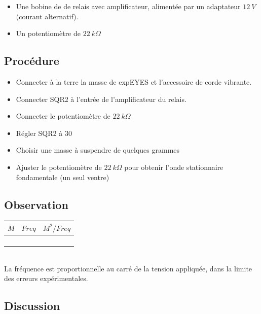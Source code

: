 \documentclass{book}
\begin{document}
\begin{itemize}
  \item Une bobine de de relais avec amplificateur, alimentée par un adaptateur $12\ V$ (courant alternatif).
  \item Un potentiomètre de $22\ k\Omega$
\end{itemize}

\subsection{Procédure}


\begin{itemize}
  \item Connecter à la terre la masse de expEYES et l'accessoire de corde vibrante.
  \item Connecter SQR2 à l'entrée de l'amplificateur du relais.
  \item Connecter le potentiomètre de $22\ k\Omega$
  \item Régler SQR2 à 30
  \item Choisir une masse à suspendre de quelques grammes
  \item Ajuster le potentiomètre de $22\ k\Omega$  pour obtenir l'onde stationnaire fondamentale (un seul ventre)
\end{itemize}

\subsection{Observation}


\begin{tabular}{|l|l|l|}
\hline
\textbf{$M$}&\textbf{$Freq$}&\textbf{$M^{2}/Freq$}
\\ \hline

&
&

\\ \hline

&
&

\\ \hline

&
&

\\ \hline

&
&

\\ \hline
\end{tabular}\\[0.5em]
La fréquence est proportionnelle au carré de la tension appliquée, dans la limite des erreurs expérimentales.

\subsection{Discussion}
\end{document}
